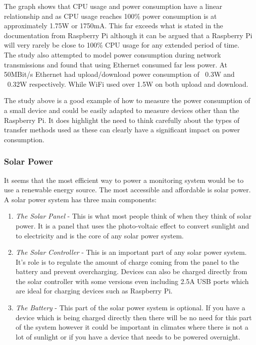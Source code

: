\documentclass[10pt,a4paper]{article}
\begin{document}
The graph shows that CPU usage and power consumption have a linear relationship and as CPU usage reaches 100\% power consumption is at approximately 1.75W or 1750mA. This far exceeds what is stated in the documentation from Raspberry Pi although it can be argued that a Raspberry Pi will very rarely be close to 100\% CPU usage for any extended period of time. The study also attempted to model power consumption during network transmissions and found that using Ethernet consumed far less power. At 50MBit/s Ethernet had upload/download power consumption of ~0.3W and ~0.32W respectively. While WiFi used over 1.5W on both upload and download. 

The study above is a good example of how to measure the power consumption of a small device and could be easily adapted to measure devices other than the Raspberry Pi. It does highlight the need to think carefully about the types of transfer methods used as these can clearly have a significant impact on power consumption.
\subsubsection{Solar Power}
It seems that the most efficient way to power a monitoring system would be to use a renewable energy source. The most accessible and affordable is solar power. A solar power system has three main components: 
\begin{enumerate}
\item\textit{The Solar Panel} - This is what most people think of when they think of solar power. It is a panel that uses the photo-voltaic effect to convert sunlight and to electricity and is the core of any solar power system.
\item\textit{The Solar Controller} - This is an important part of any solar power system. It's role is to regulate the amount of charge coming from the panel to the battery and prevent overcharging\cite{website:energymatters}. Devices can also be charged directly from the solar controller with some versions even including 2.5A USB ports which are ideal for charging devices such as Raspberry Pi.
\item\textit{The Battery} - This part of the solar power system is optional. If you have a device which is being charged directly then there will be no need for this part of the system however it could be important in climates where there is not a lot of sunlight or if you have a device that needs to be powered overnight.
\end{enumerate}
\end{document}

